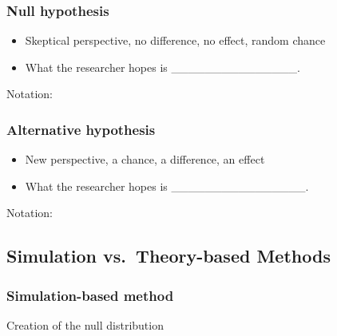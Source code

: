 \documentclass[
]{report}
\begin{document}
\hypertarget{null-hypothesis}{%
\subsubsection*{Null hypothesis}\label{null-hypothesis}}

\begin{itemize}
\item
  Skeptical perspective, no difference, no effect, random chance
\item
  What the researcher hopes is \_\_\_\_\_\_\_\_\_\_\_\_\_\_\_.
\end{itemize}

Notation:

\vspace{0.2in}

\hypertarget{alternative-hypothesis}{%
\subsubsection*{Alternative hypothesis}\label{alternative-hypothesis}}

\begin{itemize}
\item
  New perspective, a chance, a difference, an effect
\item
  What the researcher hopes is \_\_\_\_\_\_\_\_\_\_\_\_\_\_\_\_.
\end{itemize}

Notation:

\vspace{0.2in}

\hypertarget{simulation-vs.-theory-based-methods}{%
\subsection*{Simulation vs.~Theory-based Methods}\label{simulation-vs.-theory-based-methods}}

\hypertarget{simulation-based-method}{%
\subsubsection*{Simulation-based method}\label{simulation-based-method}}


Creation of the null distribution
\end{document}
